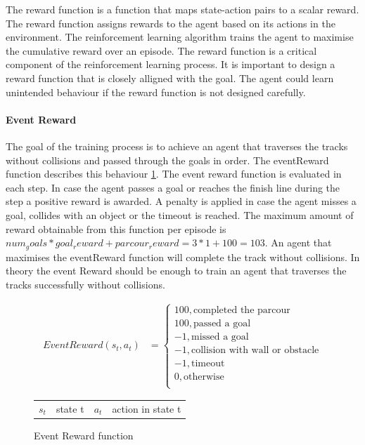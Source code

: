 The reward function is a function that maps state-action pairs to a scalar reward. The reward function assigns rewards to the agent based on its actions in the environment. The reinforcement learning algorithm trains the agent to maximise the cumulative reward over an episode. The reward function is a critical component of the reinforcement learning process. It is important to design a reward function that is closely alligned with the goal. The agent could learn unintended behaviour if the reward function is not designed carefully.

\paragraph*{Event Reward}
The goal of the training process is to achieve an agent that traverses the tracks without collisions and passed through the goals in order. The eventReward function describes this behaviour \ref{fig:eventReward_function}. The event reward function is evaluated in each step. In case the agent passes a goal or reaches the finish line during the step a positive reward is awarded. A penalty is applied in case the agent misses a goal, collides with an object or the timeout is reached. The maximum amount of reward obtainable from this function per episode is $num_goals * goal_reward + parcour_reward = 3 * 1 + 100 = 103$. An agent that maximises the eventReward function will complete the track without collisions. In theory the event Reward should be enough to train an agent that traverses the tracks successfully without collisions.


\begin{figure}
    \centering
    \begin{align}
         EventReward(s_t, a_t) &= \begin{cases}
              100,           \text{completed the parcour}           \\
              100,             \text{passed a goal}                   \\
              -1,            \text{missed a goal}                   \\
              -1,            \text{collision with wall or obstacle} \\
              -1,            \text{timeout}                         \\
              0,             \text{otherwise}                       \\
         \end{cases} \nonumber
    \end{align}
    \caption{Event Reward function}
    \begin{tabular}{r@{: }l r@{: }l}
    $s_t$& state t & $a_t$& action in state t 
    \end{tabular}
    \label{fig:eventReward_function}
\end{figure}


